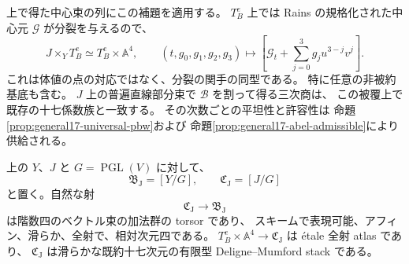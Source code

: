 上で得た中心束の列にこの補題を適用する。
$T_B^e$ 上では Rains の規格化された中心元 $\mathcal G$ が分裂を与えるので、
\begin{equation}\label{eq:jacobian-cubic-chart-pullback}
 J\times_Y T_B^e\simeq T_B^e\times\mathbb A^4,
 \qquad
 (t,g_0,g_1,g_2,g_3)\longmapsto
 [\mathcal G_t+\textstyle\sum_{j=0}^3g_j u^{3-j}v^j].
\end{equation}
これは体値の点の対応ではなく、分裂の関手の同型である。
特に任意の非被約基底も含む。
$J$ 上の普遍直線部分束で $\mathcal B$ を割って得る三次商は、
この被覆上で既存の十七係数族と一致する。
その次数ごとの平坦性と許容性は
命題\ref{prop:general17-universal-pbw}および
命題\ref{prop:general17-abel-admissible}により供給される。

\begin{proposition}[代数的周囲への相対アフィン四次元射]
\label{prop:jacobian-affine-four-morphism}
上の $Y$、$J$ と $G=\operatorname{PGL}(V)$ に対して、
\[
 \mathfrak B_{\mathrm J}=[Y/G],\qquad
 \mathfrak C_{\mathrm J}=[J/G]
\]
と置く。自然な射
\begin{equation}\label{eq:jacobian-affine-four-stack-map}
 \mathfrak C_{\mathrm J}\longrightarrow\mathfrak B_{\mathrm J}
\end{equation}
は階数四のベクトル束の加法群の torsor であり、
スキームで表現可能、アフィン、滑らか、全射で、相対次元四である。
$T_B^e\times\mathbb A^4\to\mathfrak C_{\mathrm J}$ は étale 全射 atlas であり、
$\mathfrak C_{\mathrm J}$ は滑らかな既約十七次元の有限型
Deligne--Mumford stack である。
\end{proposition}

